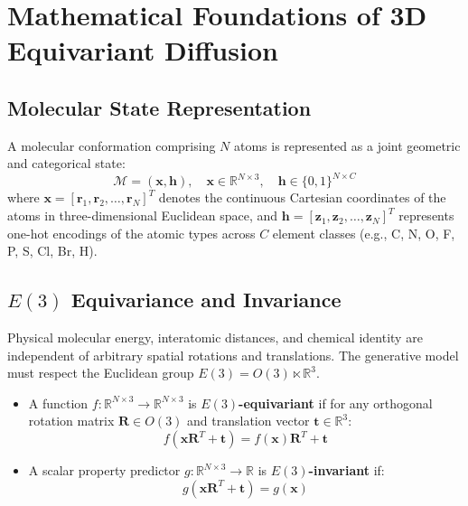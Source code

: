 \documentclass[11pt, a4paper]{article}
\begin{document}
\section{Mathematical Foundations of 3D Equivariant Diffusion}

\subsection{Molecular State Representation}
A molecular conformation comprising $N$ atoms is represented as a joint geometric and categorical state:
\begin{equation}
\mathcal{M} = (\bm{x}, \bm{h}), \quad \bm{x} \in \mathbb{R}^{N \times 3}, \quad \bm{h} \in \{0, 1\}^{N \times C}
\end{equation}
where $\bm{x} = [\bm{r}_1, \bm{r}_2, \dots, \bm{r}_N]^T$ denotes the continuous Cartesian coordinates of the atoms in three-dimensional Euclidean space, and $\bm{h} = [\bm{z}_1, \bm{z}_2, \dots, \bm{z}_N]^T$ represents one-hot encodings of the atomic types across $C$ element classes (e.g., C, N, O, F, P, S, Cl, Br, H).

\subsection{\texorpdfstring{$E(3)$}{E(3)} Equivariance and Invariance}
Physical molecular energy, interatomic distances, and chemical identity are independent of arbitrary spatial rotations and translations. The generative model must respect the Euclidean group $E(3) = O(3) \ltimes \mathbb{R}^3$.
\begin{itemize}
    \item A function $f: \mathbb{R}^{N \times 3} \to \mathbb{R}^{N \times 3}$ is \textbf{$E(3)$-equivariant} if for any orthogonal rotation matrix $\bm{R} \in O(3)$ and translation vector $\bm{t} \in \mathbb{R}^3$:
    \begin{equation}
    f(\bm{x}\bm{R}^T + \bm{t}) = f(\bm{x})\bm{R}^T + \bm{t}
    \end{equation}
    \item A scalar property predictor $g: \mathbb{R}^{N \times 3} \to \mathbb{R}$ is \textbf{$E(3)$-invariant} if:
    \begin{equation}
    g(\bm{x}\bm{R}^T + \bm{t}) = g(\bm{x})
    \end{equation}
\end{itemize}
\end{document}
